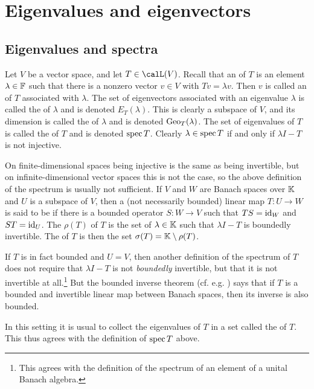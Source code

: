 \chapter{Eigenvalues and eigenvectors}

\section{Eigenvalues and spectra}

Let $V$ be a vector space, and let $T \in \lin(V)$. Recall that an  of $T$ is an element $\lambda \in \mathbb{F}$ such that there is a nonzero vector $v \in V$ with $Tv = \lambda v$. Then $v$ is called an  of $T$ associated with $\lambda$. The set of eigenvectors associated with an eigenvalue $\lambda$ is called the  of $\lambda$ and is denoted $E_T(\lambda)$. This is clearly a subspace of $V$, and its dimension is called the  of $\lambda$ and is denoted $\mathrm{Geo}_T(\lambda)$. The set of eigenvalues of $T$ is called the  of $T$ and is denoted $\operatorname{spec} T$. Clearly $\lambda \in \operatorname{spec} T$ if and only if $\lambda I - T$ is not injective.

On finite-dimensional spaces being injective is the same as being invertible, but on infinite-dimensional vector spaces this is not the case, so the above definition of the spectrum is usually not sufficient. If $V$ and $W$ are Banach spaces over $\mathbb{K}$ and $U$ is a subspace of $V$, then a (not necessarily bounded) linear map $T \colon U \to W$ is said to be  if there is a bounded operator $S \colon W \to V$ such that $TS = \operatorname{id}_W$ and $ST = \operatorname{id}_U$. The  $\rho(T)$ of $T$ is the set of $\lambda \in \mathbb{K}$ such that $\lambda I - T$ is boundedly invertible. The  of $T$ is then the set $\sigma(T) = \mathbb{K} \setminus \rho(T)$.

If $T$ is in fact bounded and $U = V$, then another definition of the spectrum of $T$ does not require that $\lambda I - T$ is not \emph{boundedly} invertible, but that it is not invertible at all.\footnote{This agrees with the definition of the spectrum of an element of a unital Banach algebra.} But the bounded inverse theorem (cf. e.g. \cite[Corollary~5.11]{follandrealanalysis}) says that if $T$ is a bounded and invertible linear map between Banach spaces, then its inverse is also bounded.

In this setting it is usual to collect the eigenvalues of $T$ in a set called the  of $T$. This thus agrees with the definition of $\operatorname{spec} T$ above.


